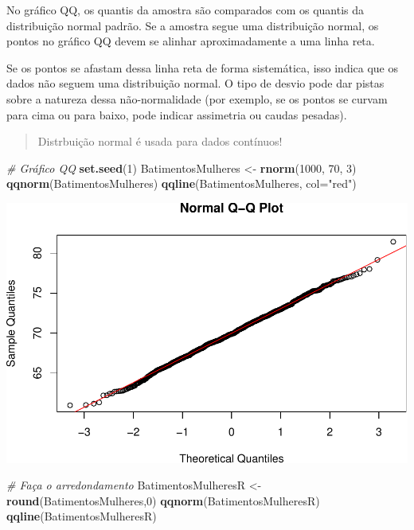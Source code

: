 \documentclass[
]{book}
\newenvironment{Shaded}{\begin{snugshade}}{\end{snugshade}}
\newcommand{\AttributeTok}[1]{\textcolor[rgb]{0.13,0.29,0.53}{#1}}
\newcommand{\CommentTok}[1]{\textcolor[rgb]{0.56,0.35,0.01}{\textit{#1}}}
\newcommand{\DecValTok}[1]{\textcolor[rgb]{0.00,0.00,0.81}{#1}}
\newcommand{\FunctionTok}[1]{\textcolor[rgb]{0.13,0.29,0.53}{\textbf{#1}}}
\newcommand{\NormalTok}[1]{#1}
\newcommand{\OtherTok}[1]{\textcolor[rgb]{0.56,0.35,0.01}{#1}}
\newcommand{\StringTok}[1]{\textcolor[rgb]{0.31,0.60,0.02}{#1}}
\begin{document}
No gráfico QQ, os quantis da amostra são comparados com os quantis da distribuição normal padrão. Se a amostra segue uma distribuição normal, os pontos no gráfico QQ devem se alinhar aproximadamente a uma linha reta.

Se os pontos se afastam dessa linha reta de forma sistemática, isso indica que os dados não seguem uma distribuição normal. O tipo de desvio pode dar pistas sobre a natureza dessa não-normalidade (por exemplo, se os pontos se curvam para cima ou para baixo, pode indicar assimetria ou caudas pesadas).

\begin{quote}
Distrbuição normal é usada para dados contínuos!
\end{quote}

\begin{Shaded}
\begin{Highlighting}[]
\CommentTok{\# Gráfico QQ}
\FunctionTok{set.seed}\NormalTok{(}\DecValTok{1}\NormalTok{)}
\NormalTok{BatimentosMulheres }\OtherTok{\textless{}{-}} \FunctionTok{rnorm}\NormalTok{(}\DecValTok{1000}\NormalTok{, }\DecValTok{70}\NormalTok{, }\DecValTok{3}\NormalTok{)}
\FunctionTok{qqnorm}\NormalTok{(BatimentosMulheres)}
\FunctionTok{qqline}\NormalTok{(BatimentosMulheres, }\AttributeTok{col=}\StringTok{"red"}\NormalTok{)}
\end{Highlighting}
\end{Shaded}

\includegraphics{LivroEstatisticaR_files/figure-latex/unnamed-chunk-33-1.pdf}

\begin{Shaded}
\begin{Highlighting}[]
\CommentTok{\# Faça o arredondamento}
\NormalTok{BatimentosMulheresR }\OtherTok{\textless{}{-}} \FunctionTok{round}\NormalTok{(BatimentosMulheres,}\DecValTok{0}\NormalTok{)}
\FunctionTok{qqnorm}\NormalTok{(BatimentosMulheresR)}
\FunctionTok{qqline}\NormalTok{(BatimentosMulheresR)}
\end{Highlighting}
\end{Shaded}
\end{document}

